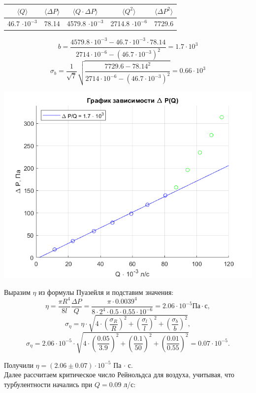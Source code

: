 \documentclass[a4paper,12pt]{article}
\begin{document}
\begin{enumerate}
\begin{equation}
\end{equation}
\begin{tabular}{|c|c|c|c|c|}
\hline 
$\langle Q \rangle$ & $\langle \Delta P \rangle$ & $\langle Q \cdot \Delta P \rangle$ & $\langle Q^2 \rangle$ & $\langle \Delta P^2 \rangle$ \\ 
\hline 
46.7 $\cdot 10^{-3}$ & 78.14 & 4579.8 $\cdot 10^{-3}$ & 2714.8 $\cdot 10^{-6}$ & 7729.6 \\ 
\hline 
\end{tabular} 
\[b = \frac{4579.8 \cdot 10^{-3} - 46.7 \cdot 10^{-3} \cdot 78.14}{2714 \cdot 10^{-6} - (46.7 \cdot 10^{-3})^2} = 1.7 \cdot 10^3 \]\;\;\;\; \[\sigma_{b} = \frac{1}{\sqrt{7}}\sqrt{\frac{7729.6 - 78.14^2}{2714 \cdot 10^{-6} - (46.7 \cdot 10^{-3})^2}} = 0.66 \cdot 10^3\]
\begin{center}
\includegraphics[width=0.9\linewidth]{plot_1.png}
\end{center}
Выразим $\eta$ из формулы Пуазейля и подставим значения:
\[
\eta = \dfrac{\pi R^4}{8 l} \dfrac{\Delta P}{Q} = \dfrac{\pi \cdot 0.0039 ^ 4}{8 \cdot 2^4 \cdot 0.5 \cdot 0.55 \cdot 10^{-6}} = 2.06 \cdot 10^{-5} \text{Па} \cdot \text{с},
\]
\[
\sigma_\eta = \eta \cdot \sqrt{4 \cdot \left( \frac{\sigma_R}{R} \right) ^ 2 + \left( \frac{\sigma_l}{l} \right) ^ 2 + \left( \frac{\sigma_b}{b} \right) ^ 2}, 
\]\[
\sigma_\eta = 2.06 \cdot 10^{-5} \cdot \sqrt{4 \cdot \left(\frac{0.05}{3.9} \right) ^ 2 + \left( \frac{0.1}{50} \right) ^ 2 + \left( \frac{0.01}{0.55} \right) ^ 2} = 0.07 \cdot 10 ^ {-5}.
\]

Получили $\eta = (2.06 \pm 0.07) \cdot 10^{-5}$ Па $\cdot$ с.\\
Далее рассчитаем критическое число Рейнольдса для воздуха, учитывая, что турбулентности начались при $Q = 0.09$ л/с:


\end{enumerate}
\end{document}
